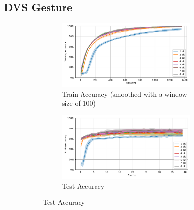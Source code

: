     \subsection{DVS Gesture}
    \label{appendix:accuracy_curves_dvs_gesture}
        \begin{figure}[H]
            \centering
            \begin{subfigure}[H]{0.69\textwidth}
                \centering
                \begin{subfigure}[H]{\textwidth}
                    \centering
                    \includegraphics[width=\textwidth]{../standard/DVSGesture/plots/dvsgesture_train_acc.pdf}
                    \caption{Train Accuracy (smoothed with a window size of 100)}
                \end{subfigure}
                \hfill
                \begin{subfigure}[H]{\textwidth}
                    \centering
                    \includegraphics[width=\textwidth]{../standard/DVSGesture/plots/dvsgesture_test_acc.pdf}
                    \caption{Test Accuracy}
                \end{subfigure}
            \end{subfigure}
            \hfill
            \begin{subfigure}[H]{0.3\textwidth}

\end{subfigure}
\end{figure}
